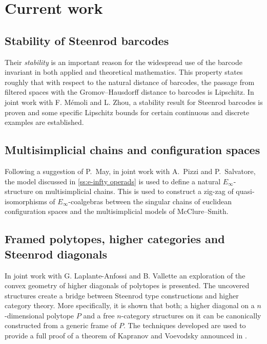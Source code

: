 \section{Current work} \label{s:current}

\subsection{Stability of Steenrod barcodes}

Their \textit{stability} is an important reason for the widespread use of the barcode invariant in both applied and theoretical mathematics.
This property states roughly that with respect to the natural distance of barcodes, the passage from filtered spaces with the Gromov--Hausdorff distance to barcodes is Lipschitz.
In joint work with F. M\'emoli and L. Zhou, a stability result for Steenrod barcodes is proven and some specific Lipschitz bounds for certain continuous and discrete examples are established.

\subsection{Multisimplicial chains and configuration spaces}

Following a suggestion of P.~May, in joint work with A.~Pizzi and P.~Salvatore, the model discussed in \ref{ss:e-infty operads} is used to define a natural $E_\infty$-structure on multisimplicial chains.
This is used to construct a zig-zag of quasi-isomorphisms of $E_\infty$-coalgebras between the singular chains of euclidean configuration spaces and the multisimplicial models of McClure--Smith.

\subsection{Framed polytopes, higher categories and Steenrod diagonals} \label{ss:polytopes}

In joint work with G. Laplante-Anfossi and B. Vallette an exploration of the convex geometry of higher diagonals of polytopes is presented.
The uncovered structures create a bridge between Steenrod type constructions and higher category theory.
More specifically, it is shown that both; a higher diagonal on a $n$-dimensional polytope $P$ and a free $n$-category structures on it can be canonically constructed from a generic frame of $P$.
The techniques developed are used to provide a full proof of a theorem of Kapranov and Voevodsky announced in \cite{kapranov1991polycategories}.

